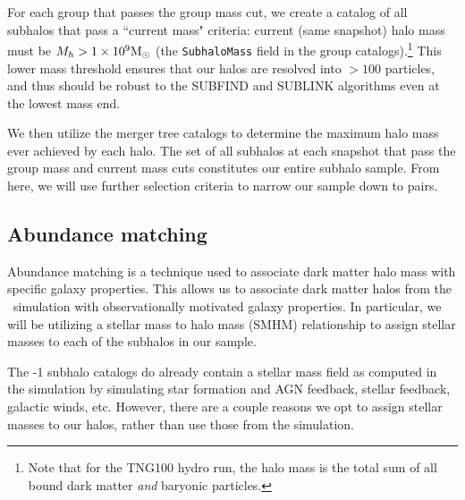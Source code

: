 \documentclass[twocolumn]{aastex631}
\begin{document}
    For each group that passes the group mass cut, we create a catalog of all subhalos that pass a ``current mass" criteria: current (same snapshot) halo mass must be $M_h > 1\times10^{9}\mathrm{M}_\odot$ (the \texttt{SubhaloMass} field in the group catalogs).\footnote{Note that for the TNG100 hydro run, the halo mass is the total sum of all bound dark matter \textit{and} baryonic particles.}
    This lower mass threshold ensures that our halos are resolved into $>100$ particles, and thus should be robust to the SUBFIND and SUBLINK algorithms even at the lowest mass end.  
    
    We then utilize the merger tree catalogs to determine the maximum halo mass ever achieved by each halo. 
    The set of all subhalos at each snapshot that pass the group mass and current mass cuts constitutes our entire subhalo sample. 
    From here, we will use further selection criteria to narrow our sample down to pairs.


    \subsection{Abundance matching} \label{sec:methods-am}
    Abundance matching is a technique used to associate dark matter halo mass with specific galaxy properties.
    This allows us to associate dark matter halos from the \tng\ simulation with observationally motivated galaxy properties. %
    In particular, we will be utilizing a stellar mass to halo mass (SMHM) relationship to assign stellar masses to each of the subhalos in our sample. 

    The -1 subhalo catalogs do already contain a stellar mass field as computed in the simulation by simulating star formation and  AGN feedback, stellar feedback, galactic winds, etc.    
    However, there are a couple reasons we opt to assign stellar masses to our halos, rather than use those from the simulation. 
    
\end{document}
